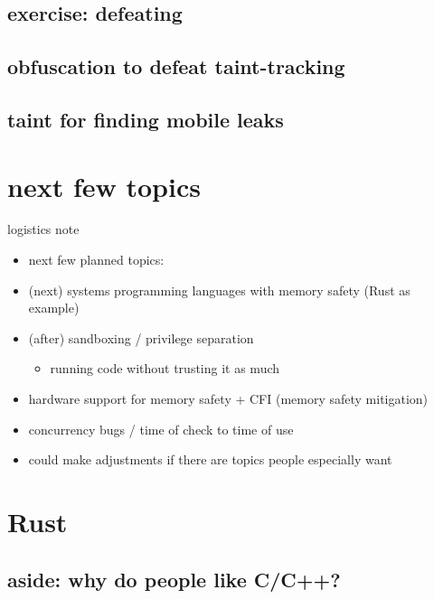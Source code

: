 \subsection{exercise: defeating} 


\subsection{obfuscation to defeat taint-tracking}


\subsection{taint for finding mobile leaks}



\section{next few topics}
\begin{frame}{logistics note}
    \begin{itemize}
    \item next few planned topics:
    \vspace{.5cm}
    \item (next) systems programming languages with memory safety (Rust as example)
    \item (after) sandboxing / privilege separation
        \begin{itemize}
        \item running code without trusting it as much
        \end{itemize}
    \item hardware support for memory safety + CFI (memory safety mitigation)
    \item concurrency bugs / time of check to time of use
    \vspace{.5cm}
    \item could make adjustments if there are topics people especially want
    \end{itemize}
\end{frame}

\section{Rust}

\subsection{aside: why do people like C/C++?}


